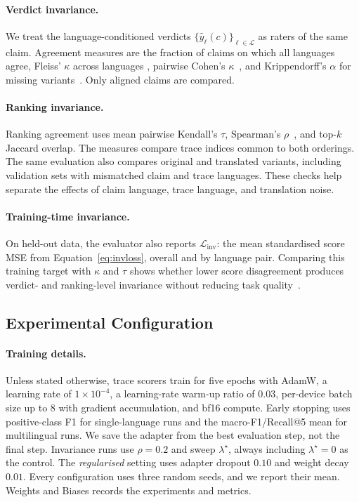 \paragraph{Verdict invariance.}
We treat the language-conditioned verdicts
$\{\hat{y}_\ell(c)\}_{\ell\in\mathcal{L}}$ as raters of the same claim. Agreement measures are the
fraction of claims on which all languages agree, Fleiss' $\kappa$ across languages
\cite{fleiss1971measuring}, pairwise Cohen's $\kappa$~\cite{cohen1960coefficient}, and
Krippendorff's $\alpha$ for missing variants~\cite{krippendorff2004content}. Only aligned claims are
compared.

\paragraph{Ranking invariance.}
Ranking agreement uses mean pairwise Kendall's $\tau$, Spearman's
$\rho$~\cite{kendall1938new,spearman1904proof}, and top-$k$ Jaccard overlap. The measures compare trace
indices common to both orderings. The same evaluation also compares original and translated variants,
including validation sets with mismatched claim and trace languages. These checks help separate the
effects of claim language, trace language, and translation noise.

\paragraph{Training-time invariance.}
On held-out data, the evaluator also reports $\mathcal{L}_{\text{inv}}$: the mean standardised score
MSE from Equation~\eqref{eq:invloss}, overall and by language pair. Comparing this training target with
$\kappa$ and $\tau$ shows whether lower score disagreement produces verdict- and ranking-level
invariance without reducing task quality~\cite{ifergan2024beneathsurfaceconsistencyexploring}.

\subsection{Experimental Configuration}
\label{subsec:method-config}

\paragraph{Training details.}
Unless stated otherwise, trace scorers train for five epochs with AdamW, a learning rate of
$1\!\times\!10^{-4}$, a learning-rate warm-up ratio of $0.03$, per-device batch size up to $8$ with
gradient accumulation, and bf16 compute. Early stopping uses positive-class F1 for single-language
runs and the macro-F1/Recall@5 mean for multilingual runs. We save the adapter from the best
evaluation step, not the final step. Invariance runs use $\rho=0.2$ and sweep $\lambda^\star$, always
including $\lambda^\star=0$ as the control. The \emph{regularised} setting uses adapter dropout
$0.10$ and weight decay $0.01$. Every configuration uses three random seeds, and we report their mean.
Weights and Biases records the experiments and metrics.

